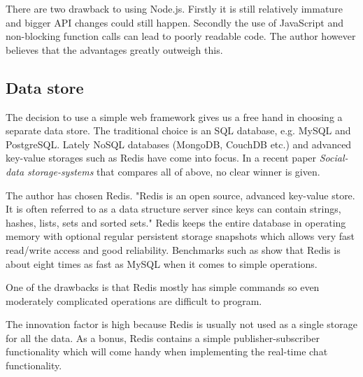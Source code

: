 \documentclass[12pt,oneside]{fithesis}
\begin{document}
		There are two drawback to using Node.js. Firstly it is still relatively immature and bigger API changes could still happen. Secondly the use of JavaScript and non-blocking function calls can lead to poorly readable code. The author however believes that the advantages greatly outweigh this.
	\subsection{Data store}		
		The decision to use a simple web framework gives us a free hand in choosing a separate data store. The traditional choice is an SQL database, e.g. MySQL and PostgreSQL. Lately NoSQL databases (MongoDB, CouchDB etc.) and  advanced key-value storages such as Redis have come into focus. In a recent paper \emph{Social-data storage-systems} \cite{Ruflin2011} that compares all of above, no clear winner is given.
		
		The author has chosen Redis. "Redis is an open source, advanced key-value store. It is often referred to as a data structure server since keys can contain strings, hashes, lists, sets and sorted sets."\cite{website:redis} Redis keeps the entire database in operating memory with optional regular persistent storage snapshots which allows very fast read/write access and good reliability.	Benchmarks such as \cite{website:ruturaj} show that Redis is about eight times as fast as MySQL when it comes to simple operations.
		
		One of the drawbacks is that Redis mostly has simple commands so even moderately complicated operations are difficult to program.
		
		The innovation factor is high because Redis is usually not used as a single storage for all the data. As a bonus, Redis contains a simple publisher-subscriber functionality which will come handy when implementing the real-time chat functionality.
\end{document}

